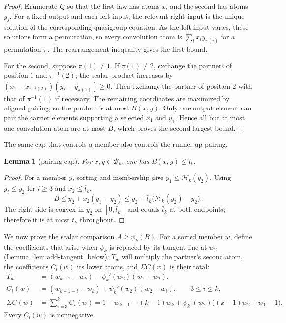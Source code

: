 \documentclass[11pt]{article}
\newtheorem{lemma}[theorem]{Lemma}
\theoremstyle{definition}
\theoremstyle{remark}
\newcommand{\body}{\mathcal{B}}
\begin{document}
\begin{proof}
Enumerate $Q$ so that the first law has atoms $x_i$ and the second has atoms
$y_j$.  For a fixed output and each left input, the relevant right input is
the unique solution of the corresponding quasigroup equation.  As the left
input varies, these solutions form a permutation, so every convolution atom
is $\sum_i x_i y_{\pi(i)}$ for a permutation $\pi$.  The rearrangement
inequality \cite[Theorem~368]{hardy1952} gives the first bound.

For the second, suppose $\pi(1)\ne1$.  If $\pi(1)\ne2$, exchange the
partners of position $1$ and $\pi^{-1}(2)$; the scalar product increases by
$(x_1-x_{\pi^{-1}(2)})(y_2-y_{\pi(1)})\ge0$.  Then exchange the partner
of position $2$ with that of $\pi^{-1}(1)$ if necessary.  The remaining
coordinates are maximized by aligned pairing, so the product is at most
$B(x,y)$.  Only one output element can pair the carrier elements supporting
a selected $x_1$ and $y_1$.  Hence all but at most one convolution atom are
at most $B$, which proves the second-largest bound.
\end{proof}

The same cap that controls a member also controls the runner-up pairing.

\begin{lemma}[pairing cap]\label{lem:add-pairing-cap}
For $x,y\in\body_k$, one has $B(x,y)\le\bar t_k$.
\end{lemma}

\begin{proof}
For a member $y$, sorting and membership give
$y_1\le\mathcal H_k(y_2)$.  Using $y_i\le y_2$ for $i\ge3$ and
$x_2\le\bar t_k$,
\[
 B\le y_2+x_2(y_1-y_2)
 \le y_2+\bar t_k\bigl(\mathcal H_k(y_2)-y_2\bigr).
\]
The right side is convex in $y_2$ on $[0,\bar t_k]$ and equals
$\bar t_k$ at both endpoints; therefore it is at most $\bar t_k$
throughout.
\end{proof}

We now prove the scalar comparison $A\ge\psi_k(B)$.  For a sorted member
$w$, define the coefficients that arise when $\psi_k$ is replaced by its
tangent line at $w_2$ (Lemma~\ref{lem:add-tangent} below): $T_w$ will
multiply the partner's second atom, the coefficients $C_i(w)$ its lower
atoms, and $\Sigma C(w)$ is their total:
\begin{align}
 T_w&=(w_{k-1}-w_k)
      -\psi_k'(w_2)(w_1-w_2),\label{eq:add-K}\\
 C_i(w)&=(w_{k+1-i}-w_k)
      +\psi_k'(w_2)(w_2-w_i),
      \qquad3\le i\le k,\label{eq:add-C}\\
 \Sigma C(w)&=\sum_{i=3}^kC_i(w)=1-w_{k-1}-(k-1)w_k
 +\psi_k'(w_2)
   \bigl((k-1)w_2+w_1-1\bigr).\label{eq:add-sumC}
\end{align}
Every $C_i(w)$ is nonnegative.
\end{document}
